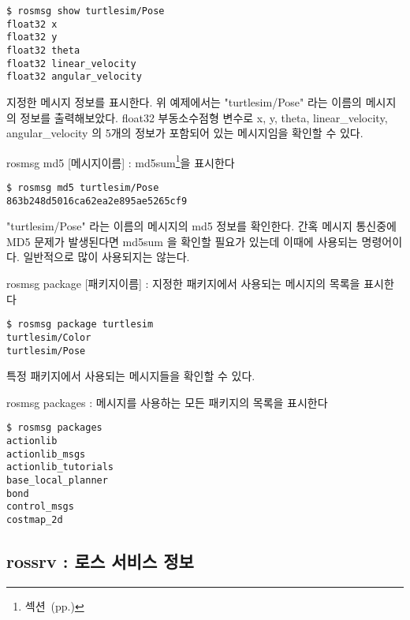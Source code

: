 \begin{lstlisting}[language=ROS]
$ rosmsg show turtlesim/Pose 
float32 x
float32 y
float32 theta
float32 linear_velocity
float32 angular_velocity
\end{lstlisting}

\noindent
지정한 메시지 정보를 표시한다. 위 예제에서는 "turtlesim/Pose" 라는 이름의 메시지의 정보를 출력해보았다. float32 부동소수점형 변수로 x, y, theta, linear\_velocity, angular\_velocity 의 5개의 정보가 포함되어 있는 메시지임을 확인할 수 있다.

\vspace{\baselineskip}
\noindent
{}\circled{\thenum} rosmsg md5 [메시지이름] : md5sum\footnote{섹션~(pp.\pageref{def:RosMD5})}을 표시한다

\begin{lstlisting}[language=ROS]
$ rosmsg md5 turtlesim/Pose 
863b248d5016ca62ea2e895ae5265cf9
\end{lstlisting}

\noindent
"turtlesim/Pose" 라는 이름의 메시지의 md5 정보를 확인한다. 간혹 메시지 통신중에 MD5 문제가 발생된다면 md5sum 을 확인할 필요가 있는데 이때에 사용되는 명령어이다. 일반적으로 많이 사용되지는 않는다.

\vspace{\baselineskip}
\noindent
{}\circled{\thenum} rosmsg package [패키지이름] : 지정한 패키지에서 사용되는 메시지의 목록을 표시한다

\begin{lstlisting}[language=ROS]
$ rosmsg package turtlesim 
turtlesim/Color
turtlesim/Pose
\end{lstlisting}

\noindent
특정 패키지에서 사용되는 메시지들을 확인할 수 있다.

\vspace{\baselineskip}
\noindent
{}\circled{\thenum} rosmsg packages : 메시지를 사용하는 모든 패키지의 목록을 표시한다

\begin{lstlisting}[language=ROS]
$ rosmsg packages
actionlib
actionlib_msgs
actionlib_tutorials
base_local_planner
bond
control_msgs
costmap_2d
\end{lstlisting}

\subsection{rossrv : 로스 서비스 정보}

